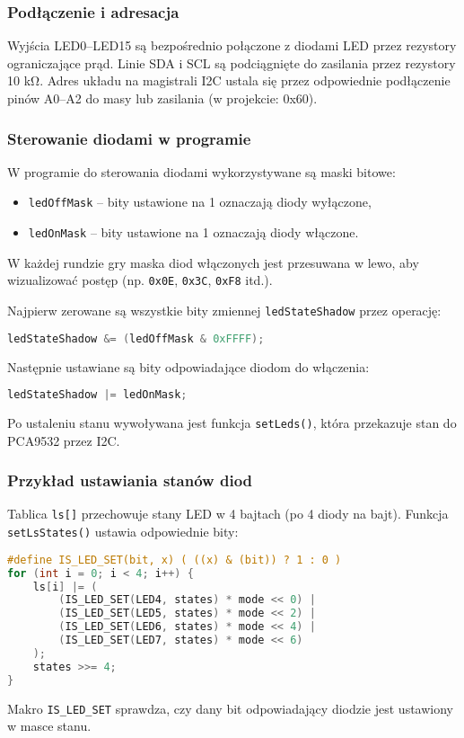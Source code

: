 \documentclass[a4paper,12pt]{report}
\begin{document}
\subsubsection*{Podłączenie i adresacja}

Wyjścia LED0–LED15 są bezpośrednio połączone z diodami LED przez rezystory ograniczające prąd. Linie SDA i SCL są podciągnięte do zasilania przez rezystory 10 k\si{\ohm}. Adres układu na magistrali I2C ustala się przez odpowiednie podłączenie pinów A0–A2 do masy lub zasilania (w projekcie: 0x60).

\subsubsection*{Sterowanie diodami w programie}

W programie do sterowania diodami wykorzystywane są maski bitowe:
\begin{itemize}
    \item \texttt{ledOffMask} – bity ustawione na 1 oznaczają diody wyłączone,
    \item \texttt{ledOnMask} – bity ustawione na 1 oznaczają diody włączone.
\end{itemize}
W każdej rundzie gry maska diod włączonych jest przesuwana w lewo, aby wizualizować postęp (np. \texttt{0x0E}, \texttt{0x3C}, \texttt{0xF8} itd.).

Najpierw zerowane są wszystkie bity zmiennej \texttt{ledStateShadow} przez operację:
\begin{lstlisting}[language=C]
ledStateShadow &= (ledOffMask & 0xFFFF);
\end{lstlisting}
Następnie ustawiane są bity odpowiadające diodom do włączenia:
\begin{lstlisting}[language=C]
ledStateShadow |= ledOnMask;
\end{lstlisting}
Po ustaleniu stanu wywoływana jest funkcja \texttt{setLeds()}, która przekazuje stan do PCA9532 przez I2C.

\subsubsection*{Przykład ustawiania stanów diod}

Tablica \texttt{ls[]} przechowuje stany LED w 4 bajtach (po 4 diody na bajt). Funkcja \texttt{setLsStates()} ustawia odpowiednie bity:
\begin{lstlisting}[language=C]
#define IS_LED_SET(bit, x) ( ((x) & (bit)) ? 1 : 0 )
for (int i = 0; i < 4; i++) {
    ls[i] |= (
        (IS_LED_SET(LED4, states) * mode << 0) |
        (IS_LED_SET(LED5, states) * mode << 2) |
        (IS_LED_SET(LED6, states) * mode << 4) |
        (IS_LED_SET(LED7, states) * mode << 6)
    );
    states >>= 4;
}
\end{lstlisting}
Makro \texttt{IS\_LED\_SET} sprawdza, czy dany bit odpowiadający diodzie jest ustawiony w masce stanu.
\end{document}
